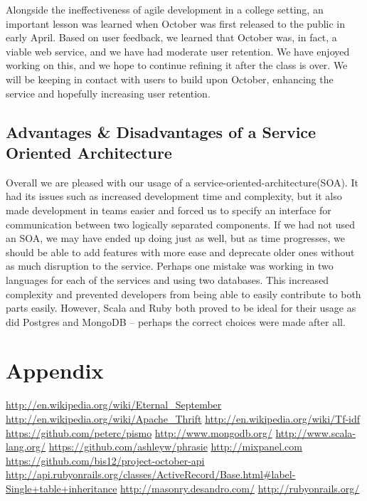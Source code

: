 \documentclass[11pt,letterpaper,titlepage]{article}
\begin{document}
Alongside the ineffectiveness of agile development in a college setting, an important lesson was learned when October was first released to the public in early April.
Based on user feedback, we learned that October was, in fact, a viable web service, and we have had moderate user retention.
We have enjoyed working on this, and we hope to continue refining it after the class is over.
We will be keeping in contact with users to build upon October, enhancing the service and hopefully increasing user retention.

\subsection{Advantages \& Disadvantages of a Service Oriented Architecture}
Overall we are pleased with our usage of a service-oriented-architecture(SOA).
It had its issues such as increased development time and complexity, but it also
made development in teams easier and forced us to specify an interface for
communication between two logically separated components.  If we had not used an
SOA, we may have ended up doing just as well, but as time progresses, we should
be able to add features with more ease and deprecate older ones without as much
disruption to the service.  Perhaps one mistake was working in two languages for
each of the services and using two databases.  This increased complexity and
prevented developers from being able to easily contribute to both  parts easily.
However, Scala and Ruby both proved to be ideal for their usage as did Postgres
and MongoDB -- perhaps the correct choices were made after all.

\section{Appendix}

\begin{thebibliography}{6}
   \url{http://en.wikipedia.org/wiki/Eternal\_September}
   \url{http://en.wikipedia.org/wiki/Apache\_Thrift}
   \url{http://en.wikipedia.org/wiki/Tf-idf}
   \url{https://github.com/peterc/pismo}
   \url{http://www.mongodb.org/}
   \url{http://www.scala-lang.org/}
   \url{https://github.com/ashleyw/phrasie}
   \url{http://mixpanel.com}
   \url{https://github.com/bis12/project-october-api}
   \url{http://api.rubyonrails.org/classes/ActiveRecord/Base.html#label-Single+table+inheritance}
   \url{http://masonry.desandro.com/}
   \url{http://rubyonrails.org/}
\end{thebibliography}
\end{document}

